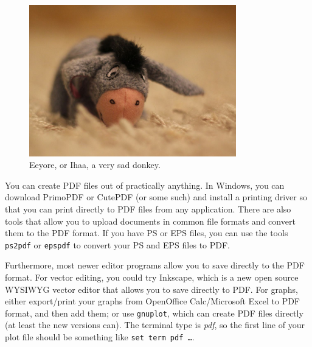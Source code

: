 \begin{figure}[ht]
  \begin{center}
    \includegraphics[width=9cm]{images/ihaa.jpg}
    \caption{Eeyore, or Ihaa, a very sad donkey.}
    \label{fig:eeyore}
  \end{center}
\end{figure}

You can create PDF files out of practically anything.
In Windows, you can download PrimoPDF or CutePDF (or some such) and install a
printing driver so that you can print directly to PDF files from any
application. There are also tools that allow you to upload documents in common
file formats and convert them to the PDF format.
If you have PS or EPS files, you can use the tools \texttt{ps2pdf} or
\texttt{epspdf} to convert your PS and EPS files to PDF\@.



Furthermore, most newer editor programs allow you to save directly to the PDF
format. For vector editing, you could try Inkscape, which is a new open source
WYSIWYG vector editor that allows you to save directly to PDF\@.
For graphs, either export/print your graphs from OpenOffice Calc/Microsoft
Excel to PDF format, and then add them; or use \texttt{gnuplot}, which can
create PDF files directly (at least the new versions can).
The terminal type is \emph{pdf}, so the first line of your plot file should be
something like \texttt{set term pdf \ldots}.

